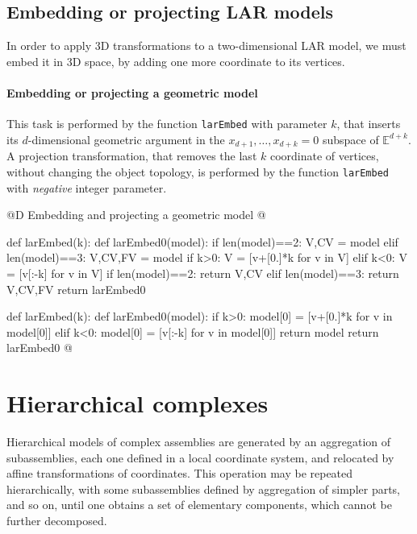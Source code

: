\documentclass[11pt,oneside]{article}    %
\def\E{\mathbb{E}}
\begin{document}
\subsection{Embedding or projecting LAR models}

In order to apply 3D transformations to a two-dimensional LAR model, we must embed it in 3D space, by adding one more coordinate to its vertices. 

\paragraph{Embedding or projecting a geometric model}

This task is performed by the function \texttt{larEmbed} with parameter $k$, that inserts its $d$-dimensional geometric argument in the $x_{d+1}, \ldots, x_{d+k}=0$ subspace of $\E^{d+k}$.
A projection transformation, that removes the last $k$ coordinate of vertices, without changing the object topology, is performed by the function \texttt{larEmbed} with \emph{negative} integer parameter.


@D Embedding and projecting a geometric model
@{def larEmbed(k):
    def larEmbed0(model):
        if len(model)==2: V,CV = model
        elif len(model)==3: V,CV,FV = model
        if k>0:
            V = [v+[0.]*k for v in V] 
        elif k<0:
            V = [v[:-k] for v in V] 
        if len(model)==2: return V,CV
        elif len(model)==3: return V,CV,FV
    return larEmbed0

def larEmbed(k):
    def larEmbed0(model):
        if k>0:
            model[0] = [v+[0.]*k for v in model[0]] 
        elif k<0:
            model[0] = [v[:-k] for v in model[0]] 
        return model
    return larEmbed0
@}

\section{Hierarchical complexes}
Hierarchical models of complex assemblies are generated by an aggregation
of subassemblies, each one defined in a local coordinate system, and
relocated by affine transformations of coordinates.  This operation
may be repeated hierarchically, with some subassemblies defined by
aggregation of simpler parts, and so on, until one obtains a set of
elementary components, which cannot be further decomposed.
\end{document}
